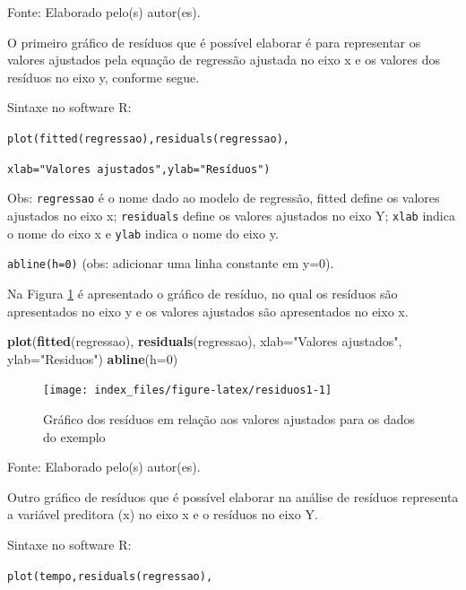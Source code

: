 \documentclass[12pt,brazil,oneside]{book}
\newenvironment{Shaded}{\begin{snugshade}}{\end{snugshade}}
\newcommand{\DataTypeTok}[1]{\textcolor[rgb]{0.13,0.29,0.53}{#1}}
\newcommand{\DecValTok}[1]{\textcolor[rgb]{0.00,0.00,0.81}{#1}}
\newcommand{\KeywordTok}[1]{\textcolor[rgb]{0.13,0.29,0.53}{\textbf{#1}}}
\newcommand{\NormalTok}[1]{#1}
\newcommand{\StringTok}[1]{\textcolor[rgb]{0.31,0.60,0.02}{#1}}
\begin{document}
Fonte: Elaborado pelo(s) autor(es).

O primeiro gráfico de resíduos que é possível elaborar é para representar os valores ajustados pela equação de regressão ajustada no eixo x e os valores dos resíduos no eixo y, conforme segue.

Sintaxe no software R:

\texttt{plot(fitted(regressao),residuals(regressao),}

\texttt{xlab="Valores\ ajustados",ylab="Resíduos")}

Obs: \texttt{regressao} é o nome dado ao modelo de regressão, fitted define os valores ajustados no eixo x; \texttt{residuals} define os valores ajustados no eixo Y; \texttt{xlab} indica o nome do eixo x e \texttt{ylab} indica o nome do eixo y.

\texttt{abline(h=0)} (obs: adicionar uma linha constante em y=0).

Na Figura \ref{fig:residuos1} é apresentado o gráfico de resíduo, no qual os resíduos são apresentados no eixo y e os valores ajustados são apresentados no eixo x.

\begin{Shaded}
\begin{Highlighting}[]
\KeywordTok{plot}\NormalTok{(}\KeywordTok{fitted}\NormalTok{(regressao), }\KeywordTok{residuals}\NormalTok{(regressao),}
\DataTypeTok{xlab=}\StringTok{"Valores ajustados"}\NormalTok{, }\DataTypeTok{ylab=}\StringTok{"Residuos"}\NormalTok{)}
\KeywordTok{abline}\NormalTok{(}\DataTypeTok{h=}\DecValTok{0}\NormalTok{)}
\end{Highlighting}
\end{Shaded}

\begin{figure}[H]

{\centering \texttt{[image: index\_files/figure-latex/residuos1-1]} 

}

\caption{Gráfico dos resíduos em relação aos valores ajustados para os dados do exemplo}\label{fig:residuos1}
\end{figure}

Fonte: Elaborado pelo(s) autor(es).

Outro gráfico de resíduos que é possível elaborar na análise de resíduos representa a variável preditora (x) no eixo x e o resíduos no eixo Y.

Sintaxe no software R:

\texttt{plot(tempo,residuals(regressao),}
\end{document}
